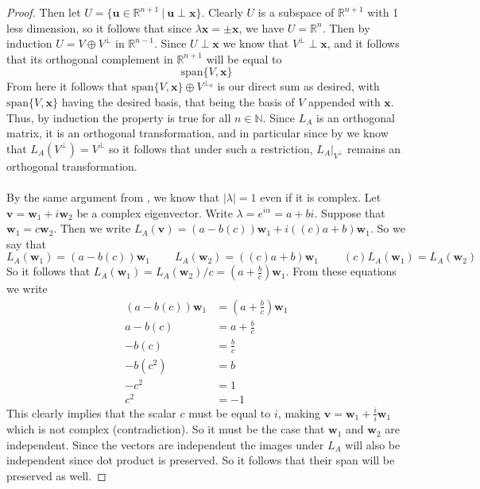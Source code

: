 \documentclass{article}
\theoremstyle{definition}
\begin{document}
\begin{proof}
    Then let $U = \{ \bm u \in \mathbb{R}^{n+1} \ | \ \bm u \perp \bm x\}$. Clearly $U$ is a subspace of $\mathbb{R}^{n+1}$
    with 1 less dimension, so it follows that since $\lambda \bm x = \pm \bm x$, we have $U = \mathbb{R}^{n}$.
    Then by induction $U = V \oplus V^\perp$ in $\mathbb{R}^{n-1}$. Since $U \perp \bm x$ we know that $V^\perp \perp \bm x$, and it follows that 
    its orthogonal complement in $\mathbb{R}^{n+1}$ will be equal to 
    \[
        \text{span}\{V, \bm x\}
    \]
    From here it follows that $\text{span}\{V, \bm x\} \oplus V^{\perp_n}$ is our direct sum as desired, with $\text{span}\{V, \bm x\}$
    having the desired basis, that being the basis of $V$ appended with $\bm x$. Thus, by induction the property is true for all $n \in \mathbb{N}$.
    Since $L_A$ is an orthogonal matrix, it is an orthogonal transformation, and in particular since by 
    we know that $L_A(V^\perp) = V^\perp$ so it follows that under such a restriction, $L_A \big|_{V^\perp}$ remains 
    an orthogonal transformation.\\\\
     By the same argument from , we know that $|\lambda| = 1$ even if it is complex.
    Let $\bm v = \bm w_1 + i\bm w_2$ be a complex eigenvector. Write $\lambda = e^{i \alpha} = a + bi$. Suppose that 
    $\bm w_1 = c\bm w_2$. Then we write $L_A(\bm v) = (a-b(c))\bm w_1 + i((c)a + b)\bm w_1$. So we say that 
    \[
        L_A(\bm w_1) = (a - b(c))\bm w_1 \ \ \ \ \ \ \ \ \ \ L_A(\bm w_2) = ((c)a + b) \bm w_1 \ \ \ \ \ \ \ \ \ \ (c)L_A(\bm w_1) = L_A(\bm w_2)
    \]    
    So it follows that $L_A(\bm w_1) = L_A(\bm w_2) / c = \left(a + \frac{b}{c}\right)\bm w_1$. From these equations we write 
    \begin{align*}
        (a-b(c))\bm w_1 &= \left(a + \frac{b}{c}\right)\bm w_1 \\
        a - b(c) &= a + \frac{b}{c} \\
        -b(c) &= \frac{b}{c} \\
        -b(c^2) &= b \\
        -c^2 &= 1 \\
        c^2 &= -1
    \end{align*}
    This clearly implies that the scalar $c$ must be equal to $i$, making $\bm v = \bm w_1 + \frac{i}{i}\bm w_1$ which is not complex (contradiction). So it must be 
    the case that $\bm w_1$ and $\bm w_2$ are independent. Since the vectors are independent the images under $L_A$ will also 
    be independent since dot product is preserved. So it follows that their span will be preserved as well.

\end{proof}
\end{document}
